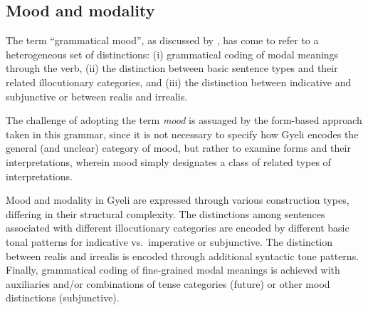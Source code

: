 \subsection*{Mood and modality}  The term ``grammatical mood'', as discussed by \citet{nuyts2016}, has come to refer to a heterogeneous set of distinctions: (i)  grammatical coding of modal meanings through the verb, (ii) the distinction between  basic sentence types and their related illocutionary categories, and (iii) the distinction between indicative and subjunctive or between realis and irrealis.

The challenge of adopting the term {\itshape mood} is assuaged by the form-based approach taken in this grammar, since it is not necessary to specify how Gyeli encodes the general (and unclear) category of mood, but rather to examine forms and their interpretations, wherein mood simply designates a class of related types of interpretations.
 


Mood and modality in Gyeli are expressed through various construction types, differing in their structural complexity.  The distinctions among sentences associated with different illocutionary categories are encoded by different basic tonal patterns for indicative vs.\ imperative or subjunctive.  The distinction between realis and irrealis is encoded through additional syntactic tone patterns. Finally, grammatical coding of fine-grained modal meanings is achieved with auxiliaries and/or combinations of tense categories (future) or other mood distinctions (subjunctive).

 






